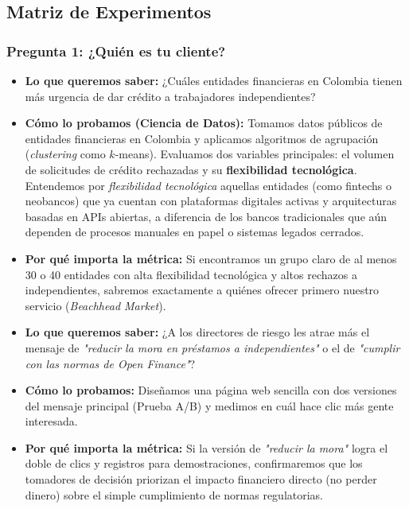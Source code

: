 \documentclass[11pt,a4paper]{article}
\begin{document}
\subsection{Matriz de Experimentos}

\subsubsection{Pregunta 1: ¿Quién es tu cliente?}

\begin{tcolorbox}[colback=lightgray,colframe=secondary,title=\textbf{Experimento 1.1: Agrupar empresas para encontrar nuestro primer cliente}]
\begin{itemize}[leftmargin=*]
    \item \textbf{Lo que queremos saber:} ¿Cuáles entidades financieras en Colombia tienen más urgencia de dar crédito a trabajadores independientes?
    \item \textbf{Cómo lo probamos (Ciencia de Datos):} Tomamos datos públicos de entidades financieras en Colombia y aplicamos algoritmos de agrupación (\textit{clustering} como $k$-means). Evaluamos dos variables principales: el volumen de solicitudes de crédito rechazadas y su \textbf{flexibilidad tecnológica}. Entendemos por \textit{flexibilidad tecnológica} aquellas entidades (como fintechs o neobancos) que ya cuentan con plataformas digitales activas y arquitecturas basadas en APIs abiertas, a diferencia de los bancos tradicionales que aún dependen de procesos manuales en papel o sistemas legados cerrados.
    \item \textbf{Por qué importa la métrica:} Si encontramos un grupo claro de al menos 30 o 40 entidades con alta flexibilidad tecnológica y altos rechazos a independientes, sabremos exactamente a quiénes ofrecer primero nuestro servicio (\textit{Beachhead Market}).
\end{itemize}
\end{tcolorbox}

\begin{tcolorbox}[colback=lightgray,colframe=secondary,title=\textbf{Experimento 1.2: Prueba A/B en página web para ver qué mensaje llama más la atención}]
\begin{itemize}[leftmargin=*]
    \item \textbf{Lo que queremos saber:} ¿A los directores de riesgo les atrae más el mensaje de \textit{"reducir la mora en préstamos a independientes"} o el de \textit{"cumplir con las normas de Open Finance"}?
    \item \textbf{Cómo lo probamos:} Diseñamos una página web sencilla con dos versiones del mensaje principal (Prueba A/B) y medimos en cuál hace clic más gente interesada.
    \item \textbf{Por qué importa la métrica:} Si la versión de \textit{"reducir la mora"} logra el doble de clics y registros para demostraciones, confirmaremos que los tomadores de decisión priorizan el impacto financiero directo (no perder dinero) sobre el simple cumplimiento de normas regulatorias.
\end{itemize}
\end{tcolorbox}
\end{document}
